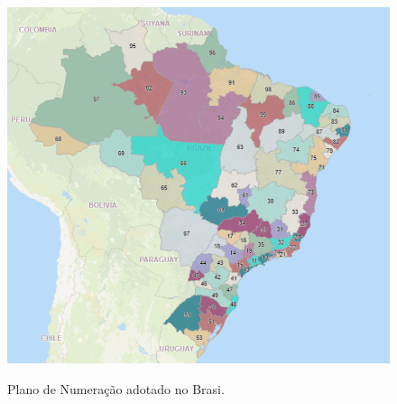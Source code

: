 \begin{figure}[h]
	\centering
	\caption{Plano de Numeração adotado no Brasi.  }
	\includegraphics[width=1\linewidth,scale=1.0]{images/mapa-ddd.png}
	\label{fig:mapa-ddd}
\end{figure}


